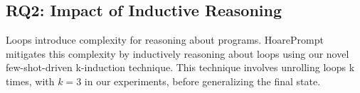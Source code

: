 \documentclass[sigconf]{acmart}
\newcommand{\projName}{HoarePrompt\xspace}
\begin{document}









\subsection{RQ2: Impact of Inductive Reasoning}

Loops introduce complexity for reasoning about programs. \projName mitigates this complexity by inductively reasoning about loops using our novel few-shot-driven k-induction technique. This technique involves unrolling loops k times, with $k=3$ in our experiments, before generalizing the final state.
\end{document}
